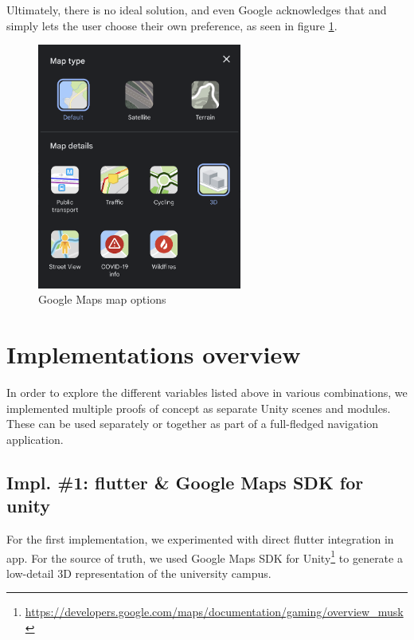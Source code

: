             Ultimately, there is no ideal solution, and even Google acknowledges that and simply lets the user choose their own preference, as seen in figure \ref{3:fig:googlemaps_types}.
            
            \begin{figure}[ht]
                \centering
                \includegraphics[width=0.6\textwidth]{figures/googlemaps_types.png}
                \caption{Google Maps map options}
                \label{3:fig:googlemaps_types}
            \end{figure}


\section{Implementations overview} \label{3:implementations_overview}

    In order to explore the different variables listed above in various combinations, we implemented multiple proofs of concept as separate Unity scenes and modules. These can be used separately or together as part of a full-fledged navigation application.

    \subsection{Impl. \#1: \gls{flutter} \& Google Maps SDK for \gls{unity}} \label{3:impl1}
    
        For the first implementation, we experimented with direct \gls{flutter} integration in \gls{app}. For the source of truth, we used Google Maps SDK for Unity\footnote{\url{https://developers.google.com/maps/documentation/gaming/overview_musk}} to generate a low-detail 3D representation of the university campus.
    
